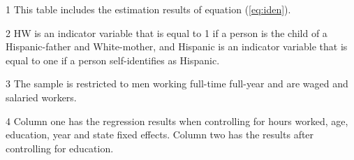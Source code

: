 \begin{table}[H]
{\begin{threeparttable}
\begin{tabular}[t]{lcccc}
\end{tabular}
\begin{tablenotes}
\item[1] \footnotesize{This table includes the estimation results of equation (\ref{eq:iden}).}
\item[2] \footnotesize{HW is an indicator variable that is equal to 1 if a person is the child of a Hispanic-father and White-mother, and Hispanic is an indicator variable that is equal to one if a person self-identifies as Hispanic.}
\item[3] \footnotesize{The sample is restricted to men working full-time full-year and are waged and salaried workers.}
\item[4] \footnotesize{Column one has the regression results when controlling for hours worked, age, education, year and state fixed effects. Column two has the results after controlling for education.}
\end{tablenotes}
\end{threeparttable}}
\end{table}
